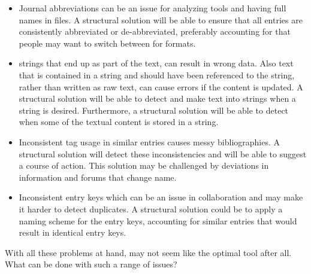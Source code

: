 \begin{itemize}
\item Journal abbreviations can be an issue for analyzing tools and
  having full names in {\bibtex} files.  A structural solution will be
  able to ensure that all entries are consistently abbreviated or
  de-abbreviated, preferably accounting for that people may want to
  switch between for formats.

\item {\bibtex} strings that end up as part of the text, can result in
  wrong data.  Also text that is contained in a string and should have
  been referenced to the string, rather than written as raw text, can
  cause errors if the content is updated.  A structural solution will
  be able to detect and make text into strings when a string is
  desired.  Furthermore, a structural solution will be able to detect
  when some of the textual content is stored in a string.

\item Inconsistent tag usage in similar entries causes messy
  bibliographies. A structural solution will detect these
  inconsistencies and will be able to suggest a course of action.
  This solution may be challenged by deviations in information and
  forums that change name.

\item Inconsistent entry keys which can be an issue in collaboration
  and may make it harder to detect duplicates.  A structural solution
  could be to apply a naming scheme for the entry keys, accounting for
  similar entries that would result in identical entry keys.
\end{itemize}

With all these problems at hand, {\bibtex} may not seem like the
optimal tool after all.  What can be done with such a range of
issues?
